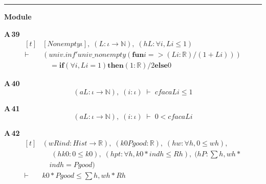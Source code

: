 \vspace{4pt}\noindent\rule{\columnwidth}{0.4pt}\par\vspace{2pt}
\noindent\textbf{Module }\par\vspace{3pt}

\noindent\textbf{A\,39}\quad{}
{\footnotesize\[ \begin{aligned}[t]
&[\mathit{Nonempty} \iota ],\; (\mathit{L} : \iota \to \mathbb{N} ),\; (\mathit{hL} : \forall \mathit{i}, \mathit{L} \mathit{i} \leq 1)\\
\vdash\;&(\mathit{univ}.\mathit{inf'} \mathit{univ\_nonempty} (\mathbf{fun} \mathit{i} => (\mathit{L} \mathit{i} : \mathbb{R} ) / (1 + \mathit{L} \mathit{i})))\\
&\quad = \mathbf{if} (\forall \mathit{i}, \mathit{L} \mathit{i} = 1) \mathbf{then} (1 : \mathbb{R} ) / 2 \mathbf{else} 0
\end{aligned} \]}

\noindent\textbf{A\,40}\quad{}
{\footnotesize\[ (\mathit{a} \mathit{L} : \iota \to \mathbb{N} ),\; (\mathit{i} : \iota ) \;\vdash\; \mathit{cfac} \mathit{a} \mathit{L} \mathit{i} \leq 1 \]}

\noindent\textbf{A\,41}\quad{}
{\footnotesize\[ (\mathit{a} \mathit{L} : \iota \to \mathbb{N} ),\; (\mathit{i} : \iota ) \;\vdash\; 0 < \mathit{cfac} \mathit{a} \mathit{L} \mathit{i} \]}

\noindent\textbf{A\,42}\quad{}
{\footnotesize\[ \begin{aligned}[t]
&(\mathit{w} \mathit{R} \mathit{ind} : \mathit{Hist} \to \mathbb{R} ),\; (\mathit{k0} \mathit{Pgood} : \mathbb{R} ),\; (\mathit{hw} : \forall \mathit{h}, 0 \leq \mathit{w} \mathit{h}),\\
&\quad \; (\mathit{hk0} : 0 \leq \mathit{k0}),\; (\mathit{hpt} : \forall \mathit{h}, \mathit{k0} * \mathit{ind} \mathit{h} \leq \mathit{R} \mathit{h}),\; (\mathit{hP} : \textstyle\sum \mathit{h}, \mathit{w} \mathit{h} *\\
&\quad \mathit{ind} \mathit{h} = \mathit{Pgood})\\
\vdash\;&\mathit{k0} * \mathit{Pgood} \leq \textstyle\sum \mathit{h}, \mathit{w} \mathit{h} * \mathit{R} \mathit{h}
\end{aligned} \]}


